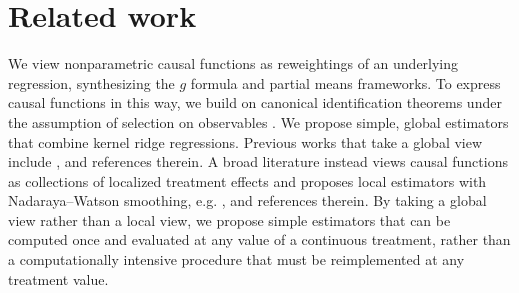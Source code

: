 \section{Related work}\label{sec:related}

We view nonparametric causal functions as reweightings of an underlying regression, synthesizing the $g$ formula \cite{robins1986new} and partial means \cite{newey1994kernel} frameworks. To express causal functions in this way, we build on canonical identification theorems under the assumption of selection on observables \cite{rosenbaum1983central,robins1986new,altonji2005cross}. We propose simple, global estimators that combine kernel ridge regressions. Previous works that take a global view include \cite{van2003unified,luedtke2016super,diaz2013targeted,kennedy2020optimal}, and references therein. A broad literature instead views causal functions as collections of localized treatment effects and proposes local estimators with Nadaraya--Watson smoothing, e.g. \cite{imai2004causal,rubin2005general,rubin2006extending,galvao2015uniformly,luedtke2016statistical,kennedy2017nonparametric,semenova2021debiased,kallus2018policy,chernozhukov2022debiased,fan2019estimation,zimmert2019nonparametric,colangelo2020double}, and references therein. By taking a global view rather than a local view, we propose simple estimators that can be computed once and evaluated at any value of a continuous treatment, rather than a computationally intensive procedure that must be reimplemented at any treatment value.

